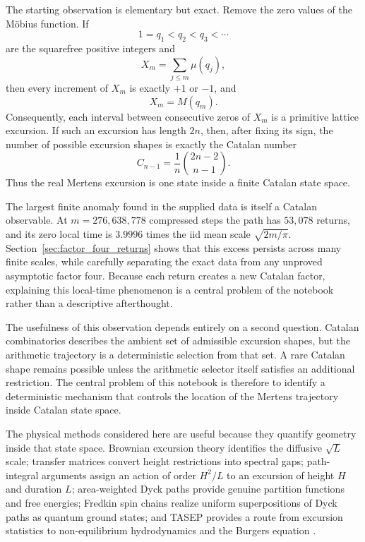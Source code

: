 \documentclass[11pt]{amsart}
\numberwithin{equation}{section}
\theoremstyle{plain}
\theoremstyle{definition}
\theoremstyle{remark}
\newcommand{\Mob}{\mu}
\newcommand{\Mert}{M}
\newcommand{\Cat}{C}
\begin{document}
The starting observation is elementary but exact.  Remove the zero values of the M\"obius function.  If
\begin{equation}
1=q_1<q_2<q_3<\cdots
\label{eq:squarefree_enumeration}
\end{equation}
are the squarefree positive integers and
\begin{equation}
X_m=\sum_{j\le m}\Mob(q_j),
\label{eq:compressed_walk}
\end{equation}
then every increment of $X_m$ is exactly $+1$ or $-1$, and
\begin{equation}
X_m=\Mert(q_m).
\label{eq:compressed_equals_mertens}
\end{equation}
Consequently, each interval between consecutive zeros of $X_m$ is a primitive lattice excursion.  If such an excursion has length $2n$, then, after fixing its sign, the number of possible excursion shapes is exactly the Catalan number
\begin{equation}
\Cat_{n-1}=\frac{1}{n}\binom{2n-2}{n-1}.
\label{eq:primitive_catalan_count_intro}
\end{equation}
Thus the real Mertens excursion is one state inside a finite Catalan state space.

The largest finite anomaly found in the supplied data is itself a Catalan
observable.  At $m=276{,}638{,}778$ compressed steps the path has $53{,}078$
returns, and its zero local time is $3.9996$ times the iid mean scale
$\sqrt{2m/\pi}$.  Section~\ref{sec:factor_four_returns} shows that this excess
persists across many finite scales, while carefully separating the exact data
from any unproved asymptotic factor four.  Because each return creates a new
Catalan factor, explaining this local-time phenomenon is a central problem of
the notebook rather than a descriptive afterthought.

The usefulness of this observation depends entirely on a second question.  Catalan combinatorics describes the ambient set of admissible excursion shapes, but the arithmetic trajectory is a deterministic selection from that set.  A rare Catalan shape remains possible unless the arithmetic selector itself satisfies an additional restriction.  The central problem of this notebook is therefore to identify a deterministic mechanism that controls the location of the Mertens trajectory inside Catalan state space.

The physical methods considered here are useful because they quantify geometry inside that state space.  Brownian excursion theory identifies the diffusive $\sqrt{L}$ scale; transfer matrices convert height restrictions into spectral gaps; path-integral arguments assign an action of order $H^2/L$ to an excursion of height $H$ and duration $L$; area-weighted Dyck paths provide genuine partition functions and free energies; Fredkin spin chains realize uniform superpositions of Dyck paths as quantum ground states; and TASEP provides a route from excursion statistics to non-equilibrium hydrodynamics and the Burgers equation \cite{Kaigh1976,DurrettIglehartMiller1977,KhorunzhiyMarckert2009,Kousha2012,OwczarekPrellberg2014,DerridaEnaudLebowitz2004,DellAnnaEtAl2016}.
\end{document}
